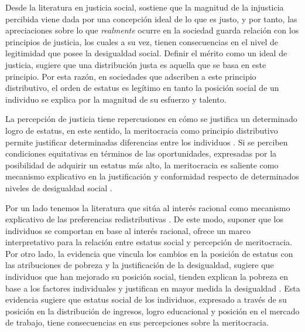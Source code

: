 \documentclass[12pt]{article}
\begin{document}

Desde la literatura en justicia social, \citet{Jasso2015} sostiene que la magnitud de la injusticia percibida viene dada por una concepción ideal de lo que es justo, y por tanto, las apreciaciones sobre lo que \textit{realmente} ocurre en la sociedad guarda relación con los principios de justicia, los cuales a su vez, tienen consecuencias en el nivel de legitimidad que posee la desigualdad social. Definir el mérito como un ideal de justicia, sugiere que una distribución justa es aquella que se basa en este principio. Por esta razón, en sociedades que adscriben a este principio distributivo, el orden de estatus es legítimo en tanto la posición social de un individuo se explica por la magnitud de su esfuerzo y talento.

La percepción de justicia tiene repercusiones en cómo se justifica un determinado logro de estatus, en este sentido, la meritocracia como principio distributivo permite justificar determinadas diferencias entre los individuos \citep{Davey1999,Day2017}. Si se perciben condiciones equitativas en términos de las oportunidades, expresadas por la posibilidad de adquirir un estatus más alto, la meritocracia es saliente como mecanismo explicativo en la justificación y conformidad respecto de determinados niveles de desigualdad social \citep{McCoy2007}.

Por un lado tenemos la literatura que sitúa al interés racional como mecanismo explicativo de las preferencias redistributivas \citep{Meltzer1981,Benabou2001}. De este modo, suponer que los individuos se comportan en base al interés racional, ofrece un marco interpretativo para la relación entre estatus social y percepción de meritocracia. Por otro lado, la evidencia que vincula los cambios en la posición de estatus con las atribuciones de pobreza y la justificación de la desigualdad, sugiere que individuos que han mejorado su posición social, tienden explican la pobreza en base a los factores individuales y justifican en mayor medida la desigualdad \citep{Gugushvili2016a,Gugushvili2016}. Esta evidencia sugiere que estatus social de los individuos, expresado a través de su posición en la distribución de ingresos, logro educacional y posición en el mercado de trabajo, tiene consecuencias en sus percepciones sobre la meritocracia. 

\end{document}
